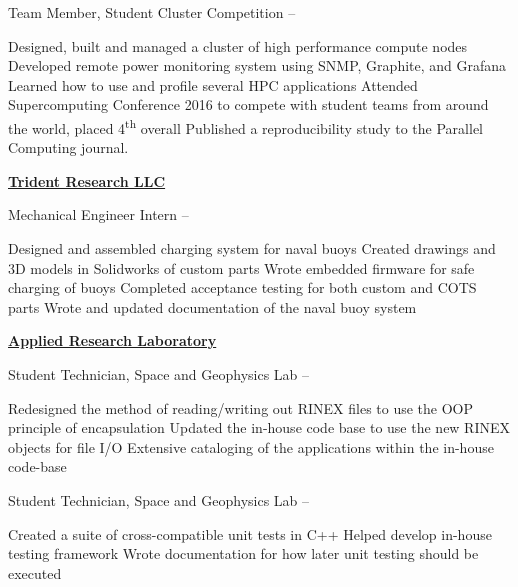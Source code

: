 \documentclass[letterpaper,MMMyyyy,nonstopmode]{simpleresumecv}
\begin{document}
\begin{Body}
\Gap
\BulletItem
Team Member, Student Cluster Competition
\hfill
{} --
\begin{Detail}
\SubBulletItem
Designed, built and managed a cluster of high performance compute nodes
\SubBulletItem
Developed remote power monitoring system using SNMP, Graphite, and Grafana
\SubBulletItem
Learned how to use and profile several HPC applications%
\SubBulletItem
Attended Supercomputing Conference 2016 to compete with student teams from around \newline 
the world, placed 4\textsuperscript{th} overall
\SubBulletItem
Published a reproducibility study to the Parallel Computing journal.
\end{Detail}

\BigGap

\Entry
\href{http://tridentresearch.com/}
{\textbf{Trident Research LLC}}

\Gap
\BulletItem
Mechanical Engineer Intern
\hfill
{} --
\begin{Detail}
\SubBulletItem
Designed and assembled charging system for naval buoys
\SubBulletItem
Created drawings and 3D models in Solidworks of custom parts
\SubBulletItem
Wrote embedded firmware for safe charging of buoys
\SubBulletItem
Completed acceptance testing for both custom and COTS parts
\SubBulletItem
Wrote and updated documentation of the naval buoy system
\end{Detail}

\BigGap

\Entry
\href{http://arlut.utexas.edu}
{\textbf{Applied Research Laboratory}}

\Gap
\BulletItem
Student Technician, Space and Geophysics Lab
\hfill
{} --
\begin{Detail}
\SubBulletItem
Redesigned the method of reading/writing out RINEX files to use the OOP principle of \newline encapsulation
\SubBulletItem
Updated the in-house code base to use the new RINEX objects for file I/O
\SubBulletItem
Extensive cataloging of the applications within the in-house code-base
\end{Detail}

\Gap
\BulletItem
Student Technician, Space and Geophysics Lab
\hfill
{} --
\begin{Detail}
\SubBulletItem
Created a suite of cross-compatible unit tests in C++
\SubBulletItem
Helped develop in-house testing framework
\SubBulletItem
Wrote documentation for how later unit testing should be executed
\end{Detail}


\end{Body}
\end{document}
